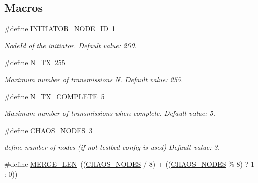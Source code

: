 \subsection*{Macros}
\begin{DoxyCompactItemize}
\item 
\hypertarget{group__chaos-test-settings_ga2e373237aef3ee2b0fdb15cd0b8c5390}{\#define \hyperlink{group__chaos-test-settings_ga2e373237aef3ee2b0fdb15cd0b8c5390}{I\-N\-I\-T\-I\-A\-T\-O\-R\-\_\-\-N\-O\-D\-E\-\_\-\-I\-D}~1}\label{group__chaos-test-settings_ga2e373237aef3ee2b0fdb15cd0b8c5390}

\begin{DoxyCompactList}\small\item\em Node\-Id of the initiator. Default value\-: 200. \end{DoxyCompactList}\item 
\hypertarget{group__chaos-test-settings_ga50f8fba62aef680d9929caefea7ca7e4}{\#define \hyperlink{group__chaos-test-settings_ga50f8fba62aef680d9929caefea7ca7e4}{N\-\_\-\-T\-X}~255}\label{group__chaos-test-settings_ga50f8fba62aef680d9929caefea7ca7e4}

\begin{DoxyCompactList}\small\item\em Maximum number of transmissions N. Default value\-: 255. \end{DoxyCompactList}\item 
\hypertarget{group__chaos-test-settings_gac350311560ae88aca71125cd35ea9b8a}{\#define \hyperlink{group__chaos-test-settings_gac350311560ae88aca71125cd35ea9b8a}{N\-\_\-\-T\-X\-\_\-\-C\-O\-M\-P\-L\-E\-T\-E}~5}\label{group__chaos-test-settings_gac350311560ae88aca71125cd35ea9b8a}

\begin{DoxyCompactList}\small\item\em Maximum number of transmissions when complete. Default value\-: 5. \end{DoxyCompactList}\item 
\hypertarget{group__chaos-test-settings_ga60caa3837557044dab47a0e8f074133f}{\#define \hyperlink{group__chaos-test-settings_ga60caa3837557044dab47a0e8f074133f}{C\-H\-A\-O\-S\-\_\-\-N\-O\-D\-E\-S}~3}\label{group__chaos-test-settings_ga60caa3837557044dab47a0e8f074133f}

\begin{DoxyCompactList}\small\item\em define number of nodes (if not testbed config is used) Default value\-: 3. \end{DoxyCompactList}\item 
\hypertarget{group__chaos-test-settings_ga866587a856ba94fe36129ce80986c2c9}{\#define \hyperlink{group__chaos-test-settings_ga866587a856ba94fe36129ce80986c2c9}{M\-E\-R\-G\-E\-\_\-\-L\-E\-N}~((\hyperlink{group__chaos-test-settings_ga60caa3837557044dab47a0e8f074133f}{C\-H\-A\-O\-S\-\_\-\-N\-O\-D\-E\-S} / 8) + ((\hyperlink{group__chaos-test-settings_ga60caa3837557044dab47a0e8f074133f}{C\-H\-A\-O\-S\-\_\-\-N\-O\-D\-E\-S} \% 8) ? 1 \-: 0))}\label{group__chaos-test-settings_ga866587a856ba94fe36129ce80986c2c9}


\end{DoxyCompactItemize}
